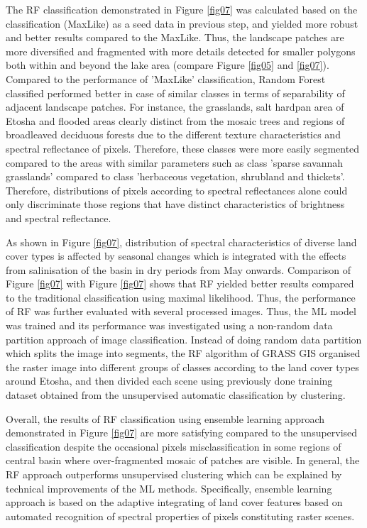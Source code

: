 \documentclass[draft]{agujournal2019}
\begin{document}
The RF classification demonstrated in Figure \ref{fig07} was calculated based on the classification (MaxLike) as a seed data in previous step, and yielded more robust and better results compared to the MaxLike. Thus, the landscape patches are more diversified and fragmented with more details detected for smaller polygons both within and beyond the lake area (compare Figure \ref{fig05} and \ref{fig07}). Compared to the performance of 'MaxLike' classification, Random Forest classified performed better in case of similar classes in terms of separability of adjacent landscape patches. For instance, the grasslands, salt hardpan area of Etosha and flooded areas clearly distinct from the mosaic trees and regions of broadleaved deciduous forests due to the different texture characteristics and spectral reflectance of pixels. Therefore, these classes were more easily segmented compared to the areas with similar parameters such as class 'sparse savannah grasslands' compared to class 'herbaceous vegetation, shrubland and thickets'. Therefore, distributions of pixels according to spectral reflectances alone could only discriminate those regions that have distinct characteristics of brightness and spectral reflectance.

As shown in Figure \ref{fig07}, distribution of spectral characteristics of diverse land cover types is affected by seasonal changes which is integrated with the effects from salinisation of the basin in dry periods from May onwards. Comparison of Figure  \ref{fig07} with Figure \ref{fig07} shows that RF yielded better results compared to the traditional classification using maximal likelihood. Thus, the performance of RF was further evaluated with several processed images. Thus, the ML model was trained and its performance was investigated using a non-random data partition approach of image classification. Instead of doing random data partition which splits the image into segments, the RF algorithm of GRASS GIS organised the raster image into different groups of classes according to the land cover types around Etosha, and then divided each scene using previously done training dataset obtained from the unsupervised automatic classification by clustering.

Overall, the results of RF classification using ensemble learning approach demonstrated in Figure \ref{fig07} are more satisfying compared to the unsupervised classification despite the occasional pixels misclassification in some regions of central basin where over-fragmented mosaic of patches are visible. In general, the RF approach outperforms unsupervised clustering which can be explained by technical improvements of the ML methods. Specifically, ensemble learning approach is based on the adaptive integrating of land cover features based on automated recognition of spectral properties of pixels constituting raster scenes. 
\end{document}
